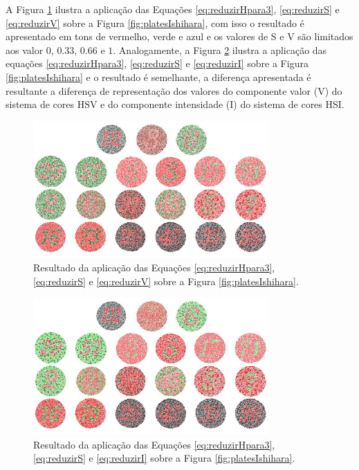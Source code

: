 \documentclass[	12pt, Times, openright, twoside, a4paper, english, brazil]{abntex2}
\begin{document}
A Figura \ref{fig:reduzirHSeV} ilustra a aplicação das Equações \ref{eq:reduzirHpara3}, \ref{eq:reduzirS} e \ref{eq:reduzirV} sobre a Figura \ref{fig:platesIshihara}, com isso o resultado é apresentado em tons de vermelho, verde e azul e os valores de S e V são limitados aos valor $0$, $0.33$, $0.66$ e $1$. Analogamente, a Figura \ref{fig:reduzirHSeI} ilustra a aplicação das equações \ref{eq:reduzirHpara3}, \ref{eq:reduzirS} e \ref{eq:reduzirI} sobre a Figura \ref{fig:platesIshihara} e o resultado é semelhante, a diferença apresentada é resultante a diferença de representação dos valores do componente valor (V) do sistema de cores HSV e do componente intensidade (I) do sistema de cores HSI.

\begin{figure}[!htb]
\centering \includegraphics[width=0.80\textwidth]{figuraDeslocarHSeV.jpg}
\caption{Resultado da aplicação das Equações \ref{eq:reduzirHpara3}, \ref{eq:reduzirS} e \ref{eq:reduzirV} sobre a Figura \ref{fig:platesIshihara}. \label{fig:reduzirHSeV}}
\end{figure}

\begin{figure}[!htb]
\centering \includegraphics[width=0.80\textwidth]{figuraDeslocarHSeI.jpg}
\caption{Resultado da aplicação das Equações \ref{eq:reduzirHpara3}, \ref{eq:reduzirS} e \ref{eq:reduzirI} sobre a Figura \ref{fig:platesIshihara}. \label{fig:reduzirHSeI}}
\end{figure}
\end{document}
